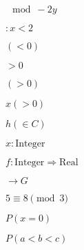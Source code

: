 \documentclass{article}
\begin{document}

$\mod -2y$

$:x<2$

$(<0)$ 

$>0$

$(>0)$

$x(>0)$

$h(\in C)$

$x : \mathrm{Integer}$

$f : \mathrm{Integer} \Rightarrow \mathrm{Real}$

$\rightarrow G$

$ 5\equiv 8 \pmod 3 $


$ P(x=0) $ 

$ P ( a < b < c) $
\end{document}
